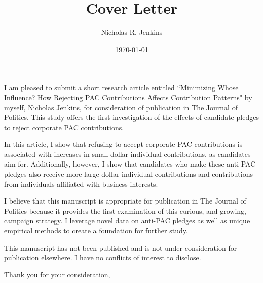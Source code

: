 \documentclass[12pt,stdletter, dateno]{newlfm}
\title{\journal Cover Letter} %
\author{Nicholas R. Jenkins}
\date{\today}
\newcommand{\journal}{The Journal of Politics} %
\begin{document}
\begin{newlfm}

I am pleased to submit a short research article entitled ``Minimizing Whose Influence? How Rejecting PAC Contributions Affects Contribution Patterns" by myself, Nicholas Jenkins, for consideration of publication in \journal.  This study offers the first investigation of the effects of candidate pledges to reject corporate PAC contributions. 

In this article, I show that refusing to accept corporate PAC contributions is associated with increases in small-dollar individual contributions, as candidates aim for. Additionally, however, I show that candidates who make these anti-PAC pledges also receive more large-dollar individual contributions and contributions from individuals affiliated with business interests. 

I believe that this manuscript is appropriate for publication in The Journal of Politics because it provides the first examination of this curious, and growing, campaign strategy. I leverage novel data on anti-PAC pledges as well as unique empirical methods to create a foundation for further study.

This manuscript has not been published and is not under consideration for publication elsewhere.  I have no conflicts of interest to disclose.

Thank you for your consideration,

\end{newlfm}
\end{document}
